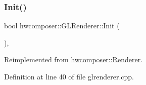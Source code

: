 \subsubsection{\texorpdfstring{Init()}{Init()}}
{\footnotesize\ttfamily bool hwcomposer\+::\+G\+L\+Renderer\+::\+Init (\begin{DoxyParamCaption}{ }\end{DoxyParamCaption})\hspace{0.3cm}{\ttfamily [override]}, {\ttfamily [virtual]}}



Reimplemented from \mbox{\hyperlink{classhwcomposer_1_1Renderer_aa7f5e7d36857fb67093b9f0cc3a7e606}{hwcomposer\+::\+Renderer}}.



Definition at line 40 of file glrenderer.\+cpp.


